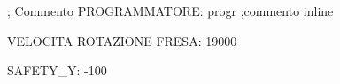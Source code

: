 ; Commento
PROGRAMMATORE:            progr    ;commento inline

VELOCITA ROTAZIONE FRESA: 19000

SAFETY_Y: -100

